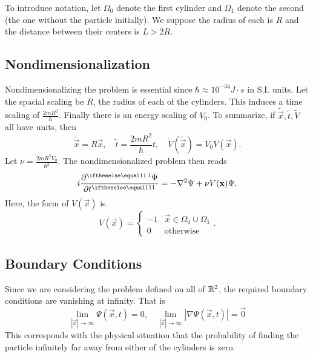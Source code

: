 \documentclass[../../main.tex]{subfiles}
\begin{document}
To introduce notation, let $\Omega_0$ denote the first cylinder and 
$\Omega_1$ denote the second (the one without the particle initially).
We suppose the radius of each is $R$ and the distance between their
centers is $L > 2 R$.

\subsection{Nondimensionalization}

Nondimensionalizing the problem is essential since 
$\hbar \approx 10^{-34} J \cdot s$ in S.I. units.  
Let the spacial scaling be $R$, the radius of each of the 
cylinders.  
This induces a time scaling of 
$\frac{2m R^2}{\hbar}$.  
Finally there is an energy scaling of $V_0$.  
To summarize, 
if $\tilde{\vec x}, \tilde t, \tilde V$ all have units, then
\begin{equation}
		\label{eq:nd}
		\tilde{\vec x} = R \vec x, \quad 
		\tilde t = \frac{2m R^2}{\hbar} t, \quad 
		\tilde V(\tilde{\vec x}) = V_0 V(\vec x)
.\end{equation}
Let $\nu = \frac{2mR^2 V_0}{\hbar^2}$.  
The nondimensionalized problem then reads
\begin{equation}
		\label{eq:schrodinger-nondim}
		i \pder{\Psi}{t} = -\nabla^2 \Psi + \nu V(\vec x) \Psi
.\end{equation}
Here, the form of $V(\vec x)$ is 
\begin{equation}
		\label{eq:potential-nondim}
		V(\vec x) = 
		\begin{cases}
				-1 & \vec x \in \Omega_0 \cup \Omega_1 \\
				0 & \text{otherwise}
		\end{cases}
.\end{equation}

\subsection{Boundary Conditions}

Since we are considering the problem defined on all of 
$\mathbb{R}^2$, the required boundary conditions are 
vanishing at infinity.  That is
\begin{equation}
		\label{eq:boundary-conditions}
		\lim_{|\vec x| \to \infty} \Psi(\vec x, t) = 0, \quad 
		\lim_{|\vec x| \to \infty} |\nabla \Psi(\vec x, t)| = \vec 0
\end{equation}
This corresponds with the physical situation that 
the probability of finding the particle infinitely far 
away from either of the cylinders is zero.
\end{document}
